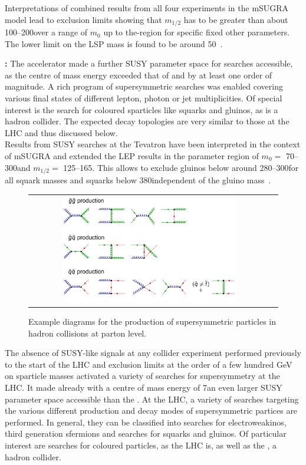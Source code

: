 \begin{description}
Interpretations of combined results from all four experiments in the mSUGRA model lead to exclusion limits showing that $m_{1/2}$ has to be greater than about 100--200\gev over a range of $m_{0}$ up to the\tev-region for specific fixed other parameters. The lower limit on the LSP mass is found to be around 50\gev~\cite{ALEPHSUSY, DELPHISUSY, L3SUSY, OPALSUSY, LEPLimits}. 
 \item \textbf{\tevatron:} The \tevatron accelerator made a further SUSY parameter space for searches accessible, as the centre of mass energy exceeded that of \hera and \lep by at least one order of magnitude. A rich program of supersymmetric searches was enabled covering various final states of different lepton, photon or jet multiplicities. Of special interest is the search for coloured sparticles like squarks and gluinos, as \tevatron is a hadron collider. The expected decay topologies are very similar to those at the LHC and thus discussed below. \\
Results from SUSY searches at the Tevatron have been interpreted in the context of mSUGRA and extended the LEP results in the parameter region of $m_{0} =$ 70--300\gev and $m_{1/2} =$ 125--165\gev. This allows to exclude gluinos below around 280--300\gev for all squark masses and squarks below $380$\gev independent of the gluino mass~\cite{CDFLimits, D0Limits, Abazov200934}. 
\end{description}
\begin{figure}[!tp]
  \centering 
  \begin{tabular}{cc}
    \includegraphics[width=0.75\textwidth]{figures/Susy_Feynman.jpg} 
  \end{tabular}
  \caption{Example diagrams for the production of supersymmetric particles in hadron collisions at parton level.}
  \label{fig:susy_feynman}
\end{figure}
The absence of SUSY-like signals at any collider experiment performed previously to the start of the LHC and exclusion limits at the order of a few hundred GeV on sparticle masses activated a variety of searches for supersymmetry at the LHC. It made already with a centre of mass energy of 7\tev an even larger SUSY parameter space accessible than the \tevatron. At the LHC, a variety of searches targeting the various different production and decay modes of supersymmetric partices are performed. In general, they can be classified into searches for electroweakinos, third generation sfermions and searches for squarks and gluinos. Of particular interest are searches for coloured particles, as the LHC is, as well as the \tevatron, a hadron collider. 
